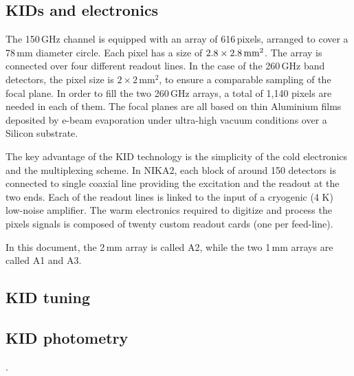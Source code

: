 \subsection{KIDs and electronics}

The 150\,GHz channel is equipped with an array of 616\,pixels, arranged to cover
a 78\,mm diameter circle. Each pixel has a size of
$2.8\times2.8\textrm{\,mm}^2$. The array is connected over four different
readout lines. In the case of the 260\,GHz band detectors, the pixel size is
$2\times 2\mathrm{\,mm}^2$, to ensure a comparable sampling of the focal
plane. In order to fill the two 260\,GHz arrays, a total of 1,140 pixels are
needed in each of them. The focal planes are all based on thin Aluminium films
deposited by e-beam evaporation under ultra-high vacuum conditions over a
Silicon substrate.

The key advantage of the KID technology is the simplicity of the cold
electronics and the multiplexing scheme. In NIKA2, each block of around 150
detectors is connected to single coaxial line providing the excitation and the
readout at the two ends. Each of the readout lines is linked to the input of a
cryogenic (4 K) low-noise amplifier. The warm electronics required to digitize
and process the pixels signals is composed of twenty custom readout cards (one
per feed-line).

In this document, the 2\,mm array is called A2, while the two 1\,mm arrays are
called A1 and A3.


\subsection{KID tuning}


\subsection{KID photometry}

.



